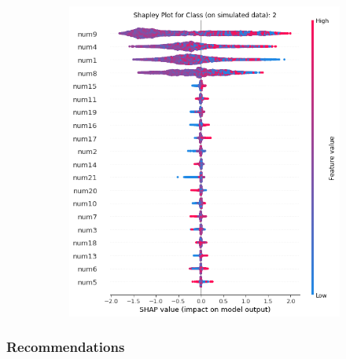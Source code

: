\documentclass{article}
\begin{document}
\begin{figure}[H]
\begin{subfigure}[tb]{.5\textwidth}
\begin{center}
			\includegraphics[width=\linewidth]{img/class_2_shap_sim.png}
			\caption{}
			\label{fig:global_shap}
		\end{center}
	\end{subfigure}%
	\captionsetup{font=footnotesize}
	\caption{}
\end{figure}

\FloatBarrier

\subsubsection{Recommendations}
\end{document}
